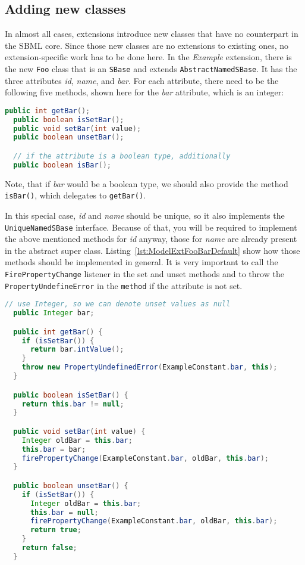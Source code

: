 \subsection{Adding new classes}
\label{subsec:addingClasses}
In almost all cases, extensions introduce new classes that have no counterpart in the SBML core.
Since those new classes are no extensions to existing ones, no extension-specific work has to be done here.
In the \emph{Example} extension, there is the new \texttt{Foo} class that is an \texttt{SBase} and extends \texttt{AbstractNamedSBase}.
It has the three attributes \emph{id}, \emph{name}, and \emph{bar}.
For each attribute, there need to be the following five methods, shown here for the \emph{bar} attribute, which is an integer:
\begin{lstlisting}[language=Java,float,caption={Five necessary methods that should be created for each \texttt{Foo} class attribute},label={lst:ModelExtFooBar}]
  public int getBar();
  public boolean isSetBar();
  public void setBar(int value);
  public boolean unsetBar();

  // if the attribute is a boolean type, additionally
  public boolean isBar();
\end{lstlisting}
Note, that if \emph{bar} would be a boolean type, we should also provide the method \texttt{isBar()}, which delegates to \texttt{getBar()}.

In this special case, \emph{id} and \emph{name} should be unique, so it also implements the \texttt{UniqueNamedSBase} interface.
Because of that, you will be required to implement the above mentioned methods for \emph{id} anyway, those for \emph{name} are already present in the abstract super class.
Listing~\vref{lst:ModelExtFooBarDefault} show how those methods should be implemented in general. It is very important to call the \texttt{FirePropertyChange} listener in the set and unset methods and to throw the \texttt{PropertyUndefineError} in the \texttt{method} if the attribute is not set.

\begin{lstlisting}[language=Java,caption={Five necessary methods that should be created for each \texttt{Foo} class attribute in detail},label={lst:ModelExtFooBarDefault}]
  // use Integer, so we can denote unset values as null
  public Integer bar;

  public int getBar() {
    if (isSetBar()) {
      return bar.intValue();
    }
    throw new PropertyUndefinedError(ExampleConstant.bar, this);
  }

  public boolean isSetBar() {
    return this.bar != null;
  }

  public void setBar(int value) {
    Integer oldBar = this.bar;
    this.bar = bar;
    firePropertyChange(ExampleConstant.bar, oldBar, this.bar);
  }

  public boolean unsetBar() {
    if (isSetBar()) {
      Integer oldBar = this.bar;
      this.bar = null;
      firePropertyChange(ExampleConstant.bar, oldBar, this.bar);
      return true;
    }
    return false;
  }
\end{lstlisting}

